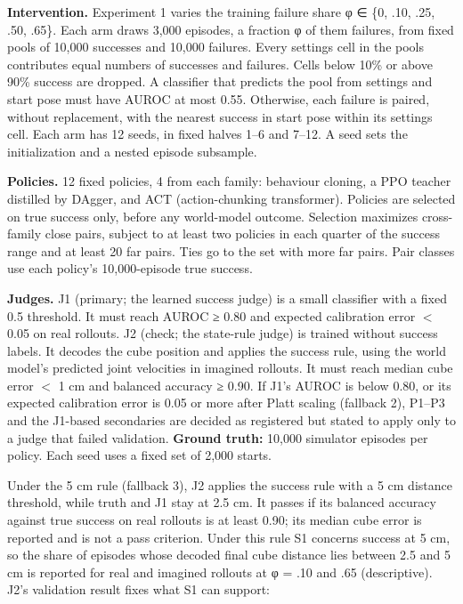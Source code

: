 \documentclass[10pt,letterpaper]{article}
\begin{document}
\textbf{Intervention.} Experiment 1 varies the training
failure share φ ∈ \{0, .10, .25, .50, .65\}. Each arm draws
3,000 episodes, a fraction φ of them failures, from fixed
pools of 10,000 successes and 10,000 failures. Every
settings cell in the pools contributes equal numbers of
successes and failures. Cells below 10\% or above 90\%
success are dropped. A classifier that predicts the pool
from settings and start pose must have AUROC at most 0.55.
Otherwise, each failure is paired, without replacement, with
the nearest success in start pose within its settings cell.
Each arm has 12 seeds, in fixed halves 1--6 and 7--12. A
seed sets the initialization and a nested episode subsample.

\textbf{Policies.} 12 fixed policies, 4 from each family:
behaviour cloning, a PPO teacher distilled by DAgger, and
ACT (action-chunking transformer). Policies are selected on
true success only, before any world-model outcome. Selection
maximizes cross-family close pairs, subject to at least two
policies in each quarter of the success range and at least
20 far pairs. Ties go to the set with more far pairs. Pair
classes use each policy's 10,000-episode true success.

\textbf{Judges.} J1 (primary; the learned success judge) is
a small classifier with a fixed 0.5 threshold. It must reach
AUROC ≥ 0.80 and expected calibration error \ensuremath{<} 0.05
on real rollouts. J2 (check; the state-rule judge) is
trained without success labels. It decodes the cube position
and applies the success rule, using the world model's
predicted joint velocities in imagined rollouts. It must
reach median cube error \ensuremath{<} 1 cm and balanced
accuracy ≥ 0.90. If J1's AUROC is below 0.80, or its
expected calibration error is 0.05 or more after Platt
scaling (fallback 2), P1--P3 and the J1-based secondaries
are decided as registered but stated to apply only to a
judge that failed validation. \textbf{Ground truth:} 10,000
simulator episodes per policy. Each seed uses a fixed set of
2,000 starts.

Under the 5 cm rule (fallback 3), J2 applies the success
rule with a 5 cm distance threshold, while truth and J1 stay
at 2.5 cm. It passes if its balanced accuracy against true
success on real rollouts is at least 0.90; its median cube
error is reported and is not a pass criterion. Under this
rule S1 concerns success at 5 cm, so the share of episodes
whose decoded final cube distance lies between 2.5 and 5 cm
is reported for real and imagined rollouts at φ = .10 and
.65 (descriptive). J2's validation result fixes what S1 can
support:
\end{document}
